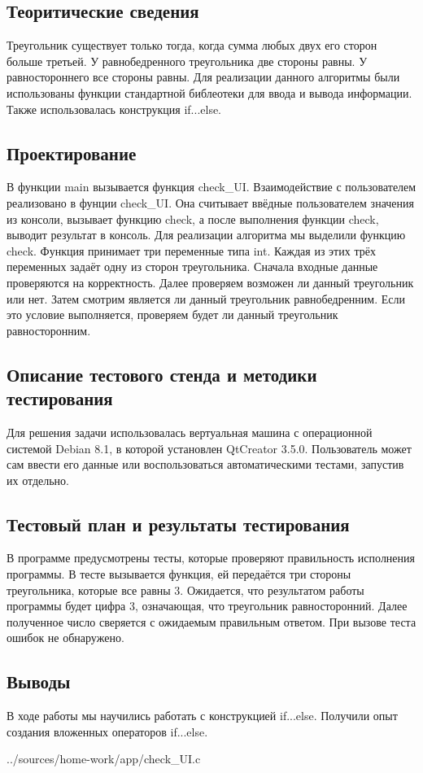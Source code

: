 \documentclass[12pt,a4paper]{report}
\begin{document}
\subsection{Теоритические сведения}
Треугольник существует только тогда, когда сумма любых двух его сторон больше третьей. У равнобедренного треугольника две стороны равны. У равностороннего все стороны равны.
Для реализации данного алгоритмы были использованы функции стандартной библеотеки для ввода и вывода информации. Также использовалась конструкция if...else. 
\subsection{Проектирование}
В функции main вызывается функция check\_UI. Взаимодействие с пользователем реализовано в фунции check\_UI. Она считывает ввёдные пользователем значения из консоли, вызывает функцию check, а после выполнения функции check, выводит результат в консоль. Для реализации алгоритма мы выделили функцию check. Функция принимает три переменные типа int. Каждая из этих трёх переменных задаёт одну из сторон треугольника. Сначала входные данные проверяются на корректность. Далее проверяем возможен ли данный треугольник или нет. Затем смотрим является ли данный треугольник равнобедренним. Если это условие выполняется, проверяем будет ли данный треугольник равносторонним.
\subsection{Описание тестового стенда и методики тестирования}
Для решения задачи использовалась вертуальная машина с операционной системой Debian 8.1, в которой установлен QtCreator 3.5.0. 
Пользователь может сам ввести его данные или воспользоваться автоматическими тестами, запустив их отдельно.
\subsection{Тестовый план и результаты тестирования}
В программе предусмотрены тесты, которые проверяют правильность исполнения программы. В тесте вызывается функция, ей передаётся три стороны треугольника, которые все равны 3. Ожидается, что результатом работы программы будет цифра 3, означающая, что треугольник равносторонний. Далее полученное число сверяется с ожидаемым правильным ответом. При вызове теста ошибок не обнаружено.
\subsection{Выводы}
В ходе работы мы научились работать с конструкцией if...else. Получили опыт создания вложенных операторов if...else.

{../sources/home-work/app/check_UI.c}
\end{document}
